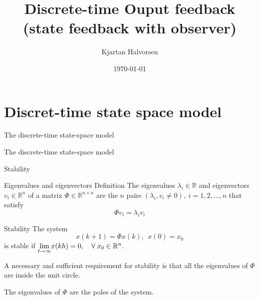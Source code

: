 \documentclass[presentation,aspectratio=1610]{beamer}
\author{Kjartan Halvorsen}
\date{\today}
\title{Discrete-time Ouput feedback (state feedback with observer)}
\begin{document}
\maketitle

\section{Discret-time state space model}
\label{sec:orgcce3085}
\begin{frame}[label={sec:orga03e75f}]{The discrete-time state-space model}
\end{frame}

\begin{frame}[label={sec:org1b7eb53}]{The discrete-time state-space model}
\begin{center}
\end{center}
\end{frame}


\begin{frame}[label={sec:org5d3c8a5}]{Stability}
\end{frame}
\begin{frame}[label={sec:org97893af}]{Eigenvalues and eigenvectors}
\alert{Definition} The eigenvalues \(\lambda_i  \in \mathbb{R}\) and eigenvectors \(v_i \in \mathbb{R}^n\) of a matrix \(\Phi \in \mathbb{R}^{n\times{}n}\) are the \(n\) pairs \((\lambda_i, v_i \neq 0 ), \; i=1,2,\ldots,n\) that satisfy
\[ \Phi v_i = \lambda_i v_i \]
\end{frame}

\begin{frame}[label={sec:org97f83c4}]{Stability}
The system
\begin{equation*}
x(k+1)=\Phi x(k), \ \ x(0)=x_0
\end{equation*}
is \alert{stable} if  \(\underset{t\to\infty}{\lim}x(kh)=0, \quad \forall\;  x_0\in\Bbb{R}^n\).

A necessary and sufficient requirement for stability is that \alert{all the eigenvalues of \(\Phi\) are inside the unit circle.}

The \alert{eigenvalues} of \(\Phi\) are the  \alert{poles} of the system.
\end{frame}
\end{document}
